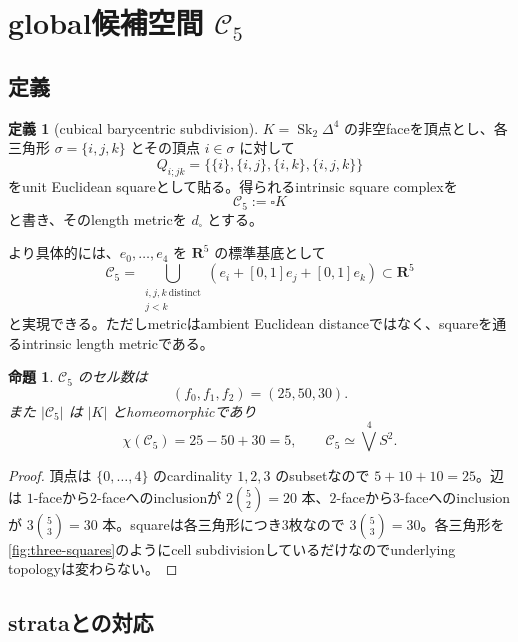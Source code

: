 \documentclass[11pt,a4paper]{ltjsarticle}
\newtheorem{proposition}[theorem]{命題}
\theoremstyle{definition}
\newtheorem{definition}[theorem]{定義}
\theoremstyle{remark}
\newcommand{\RR}{\mathbf R}
\newcommand{\cC}{\mathcal C}
\newcommand{\Sk}{\operatorname{Sk}}
\begin{document}
\section{global候補空間 $\cC_5$}

\subsection{定義}

\begin{definition}[cubical barycentric subdivision]\label{def:C5}
$K=\Sk_2\Delta^4$ の非空faceを頂点とし、各三角形
$\sigma=\{i,j,k\}$ とその頂点 $i\in\sigma$ に対して
\begin{equation}\label{eq:squarecell}
 Q_{i;jk}
 =\bigl\{\{i\},\{i,j\},\{i,k\},\{i,j,k\}\bigr\}
\end{equation}
をunit Euclidean squareとして貼る。得られるintrinsic square complexを
\[
 \cC_5:=\square K
\]
と書き、そのlength metricを $d_{\square}$ とする。
\end{definition}

より具体的には、$e_0,\dots,e_4$ を $\RR^5$ の標準基底として
\begin{equation}\label{eq:ambientC5}
 \cC_5=\bigcup_{\substack{i,j,k\ \mathrm{distinct}\\j<k}}
 \left(e_i+[0,1]e_j+[0,1]e_k\right)\subset\RR^5
\end{equation}
と実現できる。ただしmetricはambient Euclidean distanceではなく、squareを通るintrinsic length metricである。

\begin{proposition}\label{prop:cellcount}
$\cC_5$ のセル数は
\[
 (f_0,f_1,f_2)=(25,50,30).
\]
また $|\cC_5|$ は $|K|$ とhomeomorphicであり
\[
 \chi(\cC_5)=25-50+30=5,
 \qquad
 \cC_5\simeq\bigvee^4S^2.
\]
\end{proposition}

\begin{proof}
頂点は $\{0,\dots,4\}$ のcardinality $1,2,3$ のsubsetなので
$5+10+10=25$。辺は $1$-faceから$2$-faceへのinclusionが $2\binom52=20$ 本、$2$-faceから$3$-faceへのinclusionが $3\binom53=30$ 本。squareは各三角形につき3枚なので $3\binom53=30$。各三角形を\cref{fig:three-squares}のようにcell subdivisionしているだけなのでunderlying topologyは変わらない。
\end{proof}

\subsection{strataとの対応}
\end{document}
